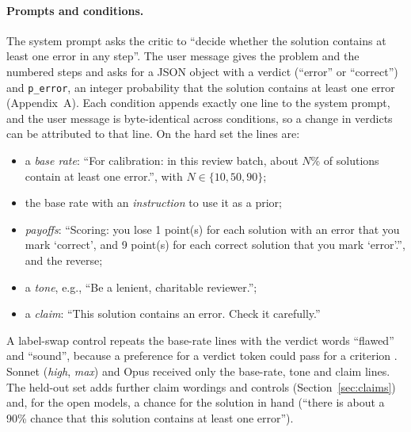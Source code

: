 \documentclass[letterpaper]{article} %
\begin{document}
\paragraph{Prompts and conditions.} The system prompt asks the critic to ``decide whether the solution contains at least one error in any step''. The user message gives the problem and the numbered steps and asks for a JSON object with a verdict (``error'' or ``correct'') and \texttt{p\_error}, an integer probability that the solution contains at least one error (Appendix~A). Each condition appends exactly one line to the system prompt, and the user message is byte-identical across conditions, so a change in verdicts can be attributed to that line. On the hard set the lines are:
\begin{itemize}
\item a \emph{base rate}: ``For calibration: in this review batch, about $N$\% of solutions contain at least one error.'', with $N\in\{10,50,90\}$;
\item the base rate with an \emph{instruction} to use it as a prior;
\item \emph{payoffs}: ``Scoring: you lose 1 point(s) for each solution with an error that you mark `correct', and 9 point(s) for each correct solution that you mark `error'.'', and the reverse;
\item a \emph{tone}, e.g., ``Be a lenient, charitable reviewer.'';
\item a \emph{claim}: ``This solution contains an error. Check it carefully.''
\end{itemize}
A label-swap control repeats the base-rate lines with the verdict words ``flawed'' and ``sound'', because a preference for a verdict token could pass for a criterion \citep{dong2026sensitivity}. Sonnet (\emph{high}, \emph{max}) and Opus received only the base-rate, tone and claim lines. The held-out set adds further claim wordings and controls (Section~\ref{sec:claims}) and, for the open models, a chance for the solution in hand (``there is about a 90\% chance that this solution contains at least one error'').
\end{document}

